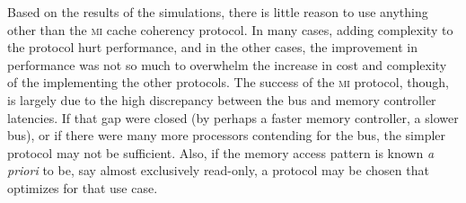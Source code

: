 \documentclass{article}
\newcommand\prot[1]{\textsc{#1}}
\newcommand\MI{\prot{mi}\xspace}
\begin{document}
  Based on the results of the simulations, there is little reason to
  use anything other than the \MI cache coherency protocol. In many
  cases, adding complexity to the protocol hurt performance, and in
  the other cases, the improvement in performance was not so much to
  overwhelm the increase in cost and complexity of the implementing
  the other protocols. The success of the \MI protocol, though, is
  largely due to the high discrepancy between the bus and memory
  controller latencies. If that gap were closed (by perhaps a faster
  memory controller, a slower bus), or if there were many more
  processors contending for the bus, the simpler protocol may not be
  sufficient. Also, if the memory access pattern is known \emph{a
    priori} to be, say almost exclusively read-only, a protocol may be
  chosen that optimizes for that use case.

\end{document}
